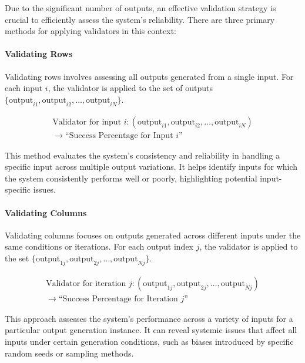 \documentclass{article}
\begin{document}
Due to the significant number of outputs, an effective validation strategy is crucial to efficiently assess the system's reliability. There are three primary methods for applying validators in this context:

\paragraph{Validating Rows}

Validating rows involves assessing all outputs generated from a single input. For each input \( i \), the validator is applied to the set of outputs \( \{\text{output}_{i1}, \text{output}_{i2}, \ldots, \text{output}_{iN}\} \).

\begin{equation*}
\begin{split}
\text{Validator for input } i: (\text{output}_{i1}, \text{output}_{i2}, \ldots, \text{output}_{iN}) \\
\rightarrow \text{``Success Percentage for Input } i\text{''}
\end{split}
\end{equation*}

This method evaluates the system's consistency and reliability in handling a specific input across multiple output variations. It helps identify inputs for which the system consistently performs well or poorly, highlighting potential input-specific issues.

\paragraph{Validating Columns}

Validating columns focuses on outputs generated across different inputs under the same conditions or iterations. For each output index \( j \), the validator is applied to the set
\( \{\text{output}_{1j}, \text{output}_{2j}, \ldots, \text{output}_{Nj}\} \).

\begin{equation*}
\begin{split}
\text{Validator for iteration } j: (\text{output}_{1j}, \text{output}_{2j}, \ldots, \text{output}_{Nj}) \\
\rightarrow \text{``Success Percentage for Iteration } j\text{''}
\end{split}
\end{equation*}

This approach assesses the system's performance across a variety of inputs for a particular output generation instance. It can reveal systemic issues that affect all inputs under certain generation conditions, such as biases introduced by specific random seeds or sampling methods.
\end{document}
